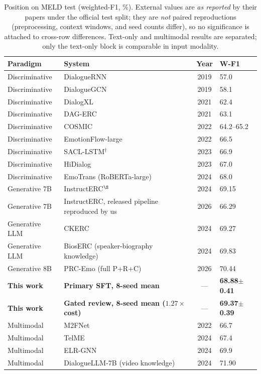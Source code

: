 \documentclass[final,5p,times,twocolumn]{elsarticle}
\begin{document}
\begin{table}[t]
\centering
\caption{Position on MELD test (weighted-F1, \%). External values are
\emph{as reported} by their papers under the official test split; they are
\emph{not} paired reproductions (preprocessing, context windows, and seed
counts differ), so no significance is attached to cross-row differences.
Text-only and multimodal results are separated; only the text-only block is
comparable in input modality.}
\label{tab:position}
\small
\begin{tabular}{llcl}
\toprule
Paradigm & System & Year & W-F1 \\
\midrule
Discriminative & DialogueRNN \citep{majumder2019dialoguernn} & 2019 & 57.0 \\
Discriminative & DialogueGCN \citep{ghosal2019dialoggcn} & 2019 & 58.1 \\
Discriminative & DialogXL \citep{shen2021dialogxl} & 2021 & 62.4 \\
Discriminative & DAG-ERC \citep{shen2021dag} & 2021 & 63.1 \\
Discriminative & COSMIC \citep{joshi2020cosmic} & 2022 & 64.2--65.2 \\
Discriminative & EmotionFlow-large \citep{song2022emotionflow} & 2022 & 66.5 \\
Discriminative & SACL-LSTM$^{\dagger}$ \citep{ji2023sacl} & 2023 & 66.9 \\
Discriminative & HiDialog \citep{liu2023hidialog} & 2023 & 67.0 \\
Discriminative & EmoTrans (RoBERTa-large) \citep{jian2024emotrans} & 2024 & 68.0 \\
Generative 7B & InstructERC$^{\S}$ \citep{lei2023instructerc} & 2024 & 69.15 \\
Generative 7B & \quad InstructERC, released pipeline reproduced by us & 2026 & 66.29 \\
Generative LLM & CKERC \citep{fu2024ckerc} & 2024 & 69.27 \\
Generative LLM & BiosERC (speaker-biography knowledge) \citep{xue2024bioserc} & 2024 & 69.83 \\
Generative 8B & PRC-Emo (full P+R+C) \citep{li2026prcemo} & 2026 & 70.44 \\
\textbf{This work} & \textbf{Primary SFT, 8-seed mean} & --- &
\textbf{68.88$\pm$0.41} \\
\textbf{This work} & \textbf{Gated review, 8-seed mean ($1.27\times$ cost)} & --- &
\textbf{69.37$\pm$0.39} \\
\midrule
Multimodal & M2FNet \citep{chudasama2022m2fnet} & 2022 & 66.7 \\
Multimodal & TelME \citep{yun2024telme} & 2024 & 67.4 \\
Multimodal & ELR-GNN \citep{shou2024elrgnn} & 2024 & 69.9 \\
Multimodal & DialogueLLM-7B (video knowledge)
\citep{zhang2024dialoguellm} & 2024 & 71.90 \\
\bottomrule
\end{tabular}


\end{table}
\end{document}
